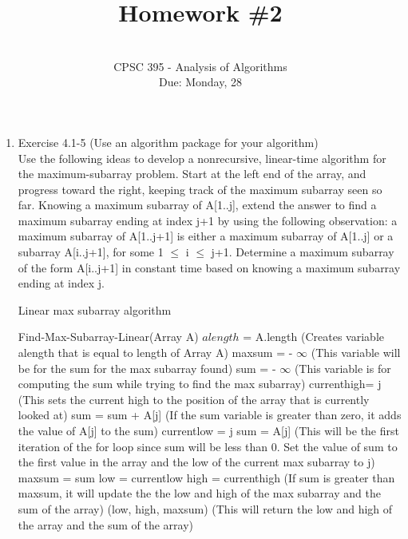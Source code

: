 \documentclass[12pt]{article}
\begin{document}
 
 
 
\title{Homework \#2}%
\author{\\ %
CPSC 395 - Analysis of Algorithms
\\ Due: Monday, 28} %
\date{}
\maketitle

\begin{enumerate}
\item Exercise 4.1-5 (Use an algorithm package for your algorithm) \\
Use the following ideas to develop a nonrecursive, linear-time algorithm for the maximum-subarray problem. Start at the left end of the array, and progress toward the right, keeping track of the maximum subarray seen so far. Knowing a maximum subarray of A[1..j], extend the answer to find a maximum subarray ending at index j+1 by using the following observation: a maximum subarray of A[1..j+1] is either a maximum subarray of A[1..j] or a subarray A[i..j+1], for some 1 $\leq$ i $\leq$ j+1. Determine a maximum subarray of the form A[i..j+1] in constant time based on knowing a maximum subarray ending at index j.

Linear max subarray algorithm
\begin{algorithmic}
\STATE Find-Max-Subarray-Linear(Array A)
\STATE $alength$ = A.length (Creates variable alength that is equal to length of Array A)
\STATE maxsum = - $\infty$ (This variable will be for the sum for the max subarray found)
\STATE sum = - $\infty$ (This variable is for computing the sum while trying to find the max subarray)
\STATE currenthigh= j (This sets the current high to the position of the array that is currently looked at)
\STATE sum = sum + A[j] (If the sum variable is greater than zero, it adds the value of A[j] to the sum)
\ENDIF
\ELSE 
\STATE currentlow = j
\STATE sum = A[j] (This will be the first iteration of the for loop since sum will be less than 0. Set the value of sum to the first value in the array and the low of the current max subarray to j)
\ENDIF
{}
\STATE maxsum = sum 
\STATE low = currentlow 
\STATE high = currenthigh (If sum is greater than maxsum, it will update the the low and high of the max subarray and the sum of the array)
\ENDIF
\ENDFOR
\RETURN (low, high, maxsum) (This will return the low and high of the array and the sum of the array)
\end{algorithmic}




\end{enumerate}
\end{document}
